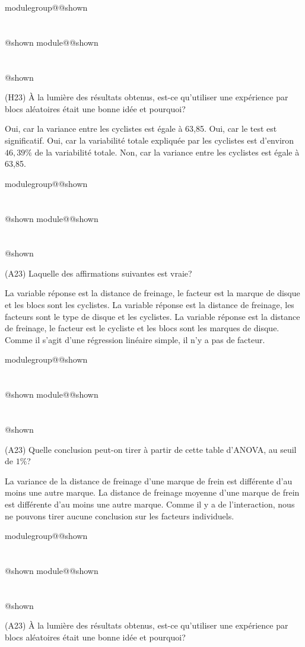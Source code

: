 \documentclass{Evaluation}
\makeatletter
\newcommand{\currentmodulekey}{}
\newcommand{\currentmoduletitle}{}
\newcommand{\currentgroupkey}{}
\newcommand{\currentgrouptitle}{}
\newcommand{\showmoduleifneeded}{%
  \ifx\currentgroupkey\empty\else
    \expandafter\ifx\csname modulegroup@\currentgroupkey @shown\endcsname\relax
      \section*{\currentgrouptitle}%
      \expandafter\gdef\csname modulegroup@\currentgroupkey @shown\endcsname{1}%
    \fi
  \fi
  \expandafter\ifx\csname module@\currentmodulekey @shown\endcsname\relax
    \section*{\currentmoduletitle}%
    \expandafter\gdef\csname module@\currentmodulekey @shown\endcsname{1}%
  \fi
}
\newenvironment{H23}{\showmoduleifneeded}{}
\newenvironment{A23}{\showmoduleifneeded}{}
\makeatother
\begin{document}
\begin{questions}
\begin{H23}
\question\label{AOVblocs3}
(H23) À la lumière des résultats obtenus, est-ce qu'utiliser une expérience par blocs aléatoires était une bonne idée et pourquoi?

\begin{checkboxes}
\choice Oui, car la variance entre les cyclistes est égale à 63,85.
\choice Oui, car le test est significatif.
\correctchoice Oui, car la variabilité totale expliquée par les cyclistes est d'environ $46,39\%$ de la variabilité totale.
\choice Non, car la variance entre les cyclistes est égale à 63,85.
\end{checkboxes}

\end{H23}

\begin{A23}
\question
(A23) Laquelle des affirmations suivantes est vraie?

\begin{checkboxes}
    \correctchoice La variable réponse est la distance de freinage, le facteur est la marque de disque et les blocs sont les cyclistes.
\choice La variable réponse est la distance de freinage, les facteurs sont le type de disque et les cyclistes.
\choice La variable réponse est la distance de freinage, le facteur est le cycliste et les blocs sont les marques de disque.
\choice Comme il s'agit d'une régression linéaire simple, il n'y a pas de facteur.
\end{checkboxes}

\vspace{0.5cm}
\end{A23}

\begin{A23}
\question
(A23) Quelle conclusion peut-on tirer à partir de cette table d'ANOVA, au seuil de $1\%$?

\begin{checkboxes}
    \choice La variance de la distance de freinage d'une marque de frein est différente d'au moins une autre marque.
\correctchoice La distance de freinage moyenne d'une marque de frein est différente d'au moins une autre marque.
\choice Comme il y a de l'interaction, nous ne pouvons tirer aucune conclusion sur les facteurs individuels.
\end{checkboxes}
\end{A23}

\begin{A23}
\question
(A23) À la lumière des résultats obtenus, est-ce qu'utiliser une expérience par blocs aléatoires était une bonne idée et pourquoi?


\end{A23}
\end{questions}
\end{document}
